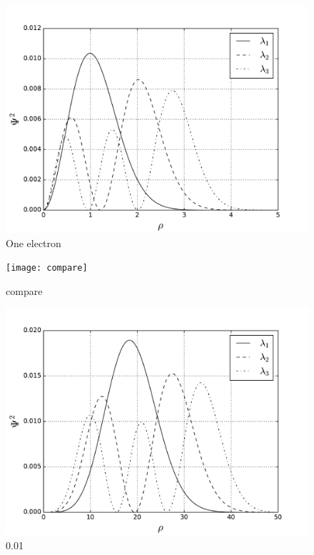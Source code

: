 \documentclass[10pt]{article}
\begin{document}
\begin{figure}
  \begin{center}
    \includegraphics[scale=0.7]{one_electron}
    \caption{One electron}
    \label{fig:one_electron}
  \end{center}
\end{figure}

\begin{figure}
  \begin{center}
    \texttt{[image: compare]}
    \caption{compare}
    \label{fig:compare}
  \end{center}
\end{figure}
\newpage
\begin{figure}
  \begin{center}
    \includegraphics[scale=0.7]{two_001}
    \caption{0.01}
    \label{fig:omega_0.01}
  \end{center}
\end{figure}
\newpage
\end{document}
